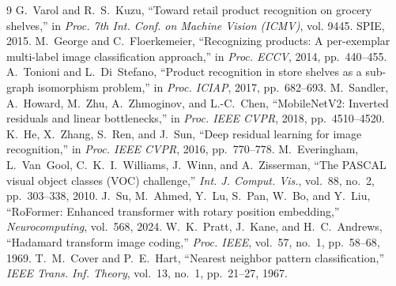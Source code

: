 \documentclass[10pt,journal,compsoc]{IEEEtran}
\begin{document}
\begin{thebibliography}{9}
 G.~Varol and R.~S.~Kuzu, ``Toward retail product recognition on
grocery shelves,'' in \emph{Proc. 7th Int. Conf. on Machine Vision (ICMV)}, vol. 9445.
SPIE, 2015.
 M.~George and C.~Floerkemeier, ``Recognizing products: A
per-exemplar multi-label image classification approach,'' in \emph{Proc. ECCV}, 2014,
pp.~440--455.
 A.~Tonioni and L.~Di~Stefano, ``Product recognition in store
shelves as a sub-graph isomorphism problem,'' in \emph{Proc. ICIAP}, 2017, pp.~682--693.
 M.~Sandler, A.~Howard, M.~Zhu, A.~Zhmoginov, and L.-C.~Chen,
``MobileNetV2: Inverted residuals and linear bottlenecks,'' in \emph{Proc. IEEE CVPR},
2018, pp.~4510--4520.
 K.~He, X.~Zhang, S.~Ren, and J.~Sun, ``Deep residual learning for
image recognition,'' in \emph{Proc. IEEE CVPR}, 2016, pp.~770--778.
 M.~Everingham, L.~Van~Gool, C.~K.~I.~Williams, J.~Winn, and
A.~Zisserman, ``The PASCAL visual object classes (VOC) challenge,'' \emph{Int. J.
Comput. Vis.}, vol.~88, no.~2, pp.~303--338, 2010.
 J.~Su, M.~Ahmed, Y.~Lu, S.~Pan, W.~Bo, and Y.~Liu, ``RoFormer:
Enhanced transformer with rotary position embedding,'' \emph{Neurocomputing}, vol.~568,
2024.
 W.~K.~Pratt, J.~Kane, and H.~C.~Andrews, ``Hadamard transform image
coding,'' \emph{Proc. IEEE}, vol.~57, no.~1, pp.~58--68, 1969.
 T.~M.~Cover and P.~E.~Hart, ``Nearest neighbor pattern
classification,'' \emph{IEEE Trans. Inf. Theory}, vol.~13, no.~1, pp.~21--27, 1967.
\end{thebibliography}
\end{document}
